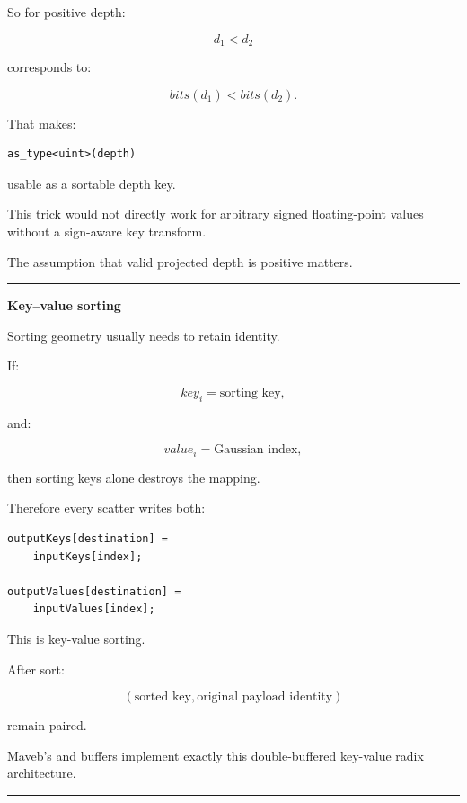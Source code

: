 So for positive depth:

\[
d_1<d_2
\]

corresponds to:

\[
bits(d_1)<bits(d_2).
\]

That makes:

\protect{}\label{brslup}%
\begin{verbatim}
as_type<uint>(depth)
\end{verbatim}

usable as a sortable depth key.

This trick would not directly work for arbitrary signed floating-point values without a sign-aware key transform.

The assumption that valid projected depth is positive matters.

\begin{center}\rule{0.5\linewidth}{0.5pt}\end{center}

\textbf{Key--value sorting}

Sorting geometry usually needs to retain identity.

If:

\[
key_i=\text{sorting key},
\]

and:

\[
value_i=\text{Gaussian index},
\]

then sorting keys alone destroys the mapping.

Therefore every scatter writes both:

\protect{}\label{oxmxax}%
\begin{verbatim}
outputKeys[destination] =
    inputKeys[index];

outputValues[destination] =
    inputValues[index];
\end{verbatim}

This is key-value sorting.

After sort:

\[
\boxed{
(\text{sorted key},\text{original payload identity})
}
\]

remain paired.

Maveb's  and  buffers implement exactly this double-buffered key-value radix architecture.

\begin{center}\rule{0.5\linewidth}{0.5pt}\end{center}

